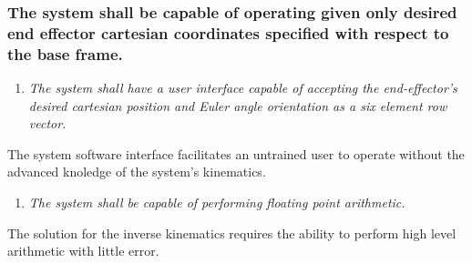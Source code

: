 \documentclass[12pt]{report}
\begin{document}
\subsubsection{The system shall be capable of operating given only desired end effector cartesian coordinates specified with respect to the base frame.}
\begin{enumerate}
  \item \textit{The system shall have a user interface capable of accepting the end-effector’s desired cartesian position and Euler angle orientation as a six element row vector.}
\end{enumerate}
  The system software interface facilitates an untrained user to operate without the advanced knoledge of the system's kinematics.
\begin{enumerate}[resume]
  \item \textit{The system shall be capable of performing floating point arithmetic.}
\end{enumerate}
The solution for the inverse kinematics requires the ability to perform high level arithmetic with little error.
\end{document}

